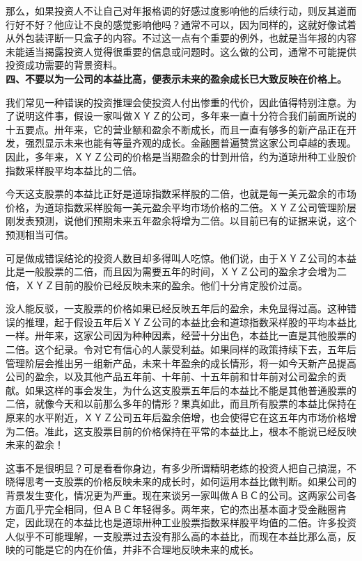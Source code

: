 \documentclass[UTF8,a4paper,zihao=-4,fontset = windows]{ctexart} %
\begin{document}
那么，如果投资人不让自己对年报格调的好感过度影响他的后续行动，则反其道而行好不好？他应让不良的感觉影响他吗？通常不可以，因为同样的，这就好像试着从外包装评断一只盒子的内容。不过这一点有个重要的例外，也就是当年报的内容未能适当揭露投资人觉得很重要的信息或问题时。这么做的公司，通常不可能提供投资成功需要的背景资料。
\\

\textbf{四、不要以为一公司的本益比高，便表示未来的盈余成长已大致反映在价格上。}


我们常见一种错误的投资推理会使投资人付出惨重的代价，因此值得特别注意。为了说明这件事，假设一家叫做ＸＹＺ的公司，多年来一直十分符合我们前面所说的十五要点。卅年来，它的营业额和盈余不断成长，而且一直有够多的新产品正在开发，强烈显示未来也能有等量齐观的成长。金融圈普遍赞赏这家公司卓越的表现。因此，多年来，ＸＹＺ公司的价格是当期盈余的廿到卅倍，约为道琼卅种工业股价指数采样股平均本益比的二倍。

今天这支股票的本益比正好是道琼指数采样股的二倍，也就是每一美元盈余的市场价格，为道琼指数采样股每一美元盈余平均市场价格的二倍。ＸＹＺ公司管理阶层刚发表预测，说他们预期未来五年盈余将增为二倍。以目前已有的证据来说，这个预测相当可信。

可是做成错误结论的投资人数目却多得叫人吃惊。他们说，由于ＸＹＺ公司的本益比是一般股票的二倍，而且因为需要五年的时间，ＸＹＺ公司的盈余才会增为二倍，ＸＹＺ目前的股价已经反映未来的盈余。他们十分肯定股价过高。

没人能反驳，一支股票的价格如果已经反映五年后的盈余，未免显得过高。这种错误的推理，起于假设五年后ＸＹＺ公司的本益比会和道琼指数采样股的平均本益比一样。卅年来，这家公司因为种种因素，经营十分出色，本益比一直是其他股票的二倍。这个纪录。令对它有信心的人蒙受利益。如果同样的政策持续下去，五年后管理阶层会推出另一组新产品，未来十年盈余的成长情形，将一如今天新产品提高公司的盈余，以及其他产品五年前、十年前、十五年前和廿年前对公司盈余的贡献。如果这样的事会发生，为什么这支股票五年后的本益比不能是其他普通股票的二倍，就像今天和以前那么多年的情形？果真如此，而且所有股票的本益比保持在原来的水平附近，ＸＹＺ公司五年后盈余倍增，也会使得它在这五年内市场价格增为二倍。准此，这支股票目前的价格保持在平常的本益比上，根本不能说已经反映未来的盈余！

这事不是很明显？可是看看你身边，有多少所谓精明老练的投资人把自己搞混，不晓得思考一支股票的价格反映未来的成长时，如何运用本益比做判断。如果公司的背景发生变化，情况更为严重。现在来谈另一家叫做ＡＢＣ的公司。这两家公司各方面几乎完全相同，但ＡＢＣ年轻得多。两年来，它的杰出基本面才受金融圈肯定，因此现在的本益比也是道琼卅种工业股票指数采样股平均值的二倍。许多投资人似乎不可能理解，一支股票过去没有那么高的本益比，而现在本益比那么高，反映的可能是它的内在价值，并非不合理地反映未来的成长。
\end{document}
